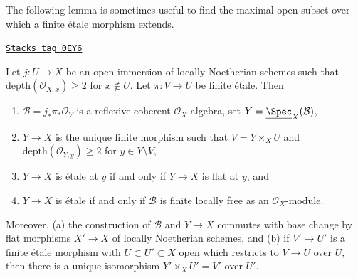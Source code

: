 The following lemma is sometimes useful to find the maximal
open subset over which a finite \'etale morphism extends.

\begin{lemma}[Extend S2]
\label{pione-lemma-extend-S2}
\href{https://stacks.math.columbia.edu/tag/0EY6}{\texttt{Stacks tag 0EY6}}

Let $j : U \to X$ be an open immersion of locally Noetherian schemes
such that $\text{depth}(\mathcal{O}_{X, x}) \geq 2$ for $x \not \in U$.
Let $\pi : V \to U$ be finite \'etale. Then
\begin{enumerate}
\item $\mathcal{B} = j_*\pi_*\mathcal{O}_V$ is a reflexive coherent
$\mathcal{O}_X$-algebra, set $Y = \underline{\Spec}_X(\mathcal{B})$,
\item $Y \to X$ is the unique finite morphism such that
$V = Y \times_X U$ and $\text{depth}(\mathcal{O}_{Y, y}) \geq 2$
for $y \in Y \setminus V$,
\item $Y \to X$ is \'etale at $y$ if and only if $Y \to X$ is flat at $y$, and
\item $Y \to X$ is \'etale if and only if $\mathcal{B}$
is finite locally free as an $\mathcal{O}_X$-module.
\end{enumerate}
Moreover, (a) the construction of $\mathcal{B}$ and $Y \to X$ commutes
with base change by flat morphisms $X' \to X$ of locally Noetherian
schemes, and (b) if $V' \to U'$ is a finite \'etale morphism with
$U \subset U' \subset X$ open which restricts to $V \to U$ over $U$,
then there is a unique isomorphism $Y' \times_X U' = V'$ over $U'$.
\end{lemma}

